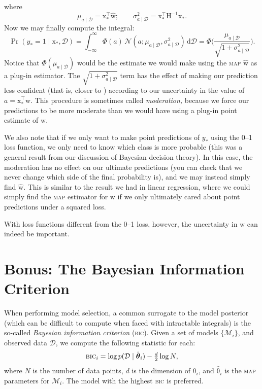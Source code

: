 \documentclass{article}
\newcommand{\acro}[1]{\textsc{\MakeLowercase{#1}}}
\newcommand{\given}{\mid}
\newcommand{\mc}[1]{\mathcal{#1}}
\newcommand{\data}{\mc{D}}
\newcommand{\model}{\mc{M}}
\newcommand{\intd}[1]{\,\mathrm{d}{#1}}
\newcommand{\inv}{^{-1}}
\newcommand{\trans}{^\top}
\newcommand{\mat}[1]{\bm{\mathrm{#1}}}
\renewcommand{\vec}[1]{\bm{\mathrm{#1}}}
\begin{document}
where
\begin{equation*}
  \mu_{a \given \data} = \vec{x}_\ast\trans \hat{\vec{w}};
  \qquad
  \sigma^2_{a \given \data} = \vec{x}_\ast\trans \mat{H}\inv \vec{x}_\ast.
\end{equation*}
Now we may finally compute the integral:
\begin{equation*}
  \Pr(y_\ast = 1 \given \vec{x}_\ast, \data)
  =
  \int_{-\infty}^\infty
  \Phi(a)
  \,
  \mc{N}(a; \mu_{a \given \data}, \sigma^2_{a \given \data})
  \intd{\data}
  =
  \Phi
  \Biggl(
  \frac{\mu_{a \given \data}}{\sqrt{1 + \sigma^2_{a \given \data}}}
  \Biggr).
\end{equation*}
Notice that $\Phi(\mu_{a \given \data})$ would be the estimate we
would make using the \acro{MAP} $\hat{\vec{w}}$ as a plug-in
estimator.  The $\sqrt{1 + \sigma^2_{a \given \data}}$ term has the
effect of making our prediction less confident (that is, closer to
) according to our uncertainty in the value of $a =
\vec{x}_\ast\trans \vec{w}$.  This procedure is sometimes called
\emph{moderation,} because we force our predictions to be more
moderate than we would have using a plug-in point estimate of
$\vec{w}$.

We also note that if we only want to make point predictions of
$y_\ast$ using the 0--1 loss function, we only need to know which
class is more probable (this was a general result from our discussion
of Bayesian decision theory).  In this case, the moderation has no
effect on our ultimate predictions (you can check that we never change
which side of  the final probability is), and we may
instead simply find $\hat{\vec{w}}$.  This is similar to the result we
had in linear regression, where we could simply find the \acro{MAP}
estimator for $\vec{w}$ if we only ultimately cared about point
predictions under a squared loss.

With loss functions different from the 0--1 loss, however, the
uncertainty in $\vec{w}$ can indeed be important.

\section*{Bonus: The Bayesian Information Criterion}

When performing model selection, a common surrogate to the model
posterior (which can be difficult to compute when faced with
intractable integrals) is the so-called \emph{Bayesian information
  criterion} (\acro{BIC}).  Given a set of models $\{ \model_i \}$,
and observed data $\data$, we compute the following statistic for each:
\begin{equation*}
  \textstyle
  \text{\acro{BIC}}_i
  =
  \log p(\data \given \hat{\vec{\theta}}_i)
  -
  \frac{d}{2} \log N,
\end{equation*}
where $N$ is the number of data points, $d$ is the dimension of
$\vec{\theta}_i$, and $\hat{\vec{\theta}}_i$ is the \acro{MAP}
parameters for $\model_i$.  The model with the highest \acro{BIC} is
preferred.
\end{document}

